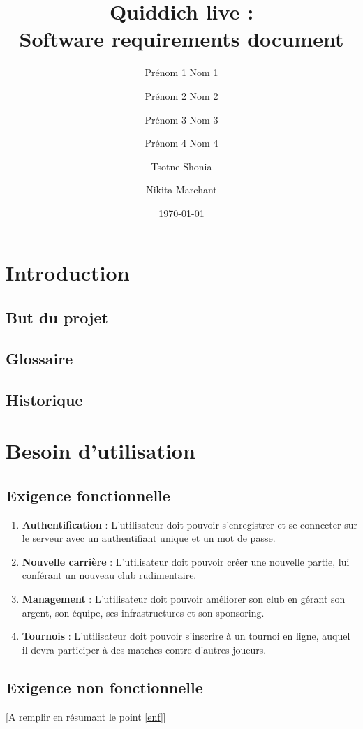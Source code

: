\documentclass[a4paper]{article}
\title{Quiddich live : \\Software requirements document}
\author{Prénom 1 Nom 1 \and Prénom 2 Nom 2 \and Prénom 3 Nom 3 \and
Prénom 4 Nom 4 \and Tsotne Shonia \and Nikita Marchant}
\date{\today}
\begin{document}
\maketitle

\section{Introduction}
\subsection{But du projet}
\subsection{ Glossaire}
\printglossaries
\subsection{Historique}
\section{Besoin d'utilisation}
\subsection{Exigence fonctionnelle}
\begin{enumerate}
\item \textbf{Authentification} : L'utilisateur doit pouvoir s'enregistrer et se connecter sur le serveur avec un authentifiant unique et un mot de passe.
\item \textbf{Nouvelle carrière} : L'utilisateur doit pouvoir créer une nouvelle partie, lui conférant un nouveau club rudimentaire.
\item \textbf{Management} : L'utilisateur doit pouvoir améliorer son club en gérant son argent, son équipe, ses infrastructures et son sponsoring.
\item \textbf{Tournois} : L'utilisateur doit pouvoir s'inscrire à un tournoi en ligne, auquel il devra participer à des matches contre d'autres joueurs.
\end{enumerate}
\subsection{Exigence non fonctionnelle}
[A remplir en résumant le point \ref{enf}]
\end{document}
